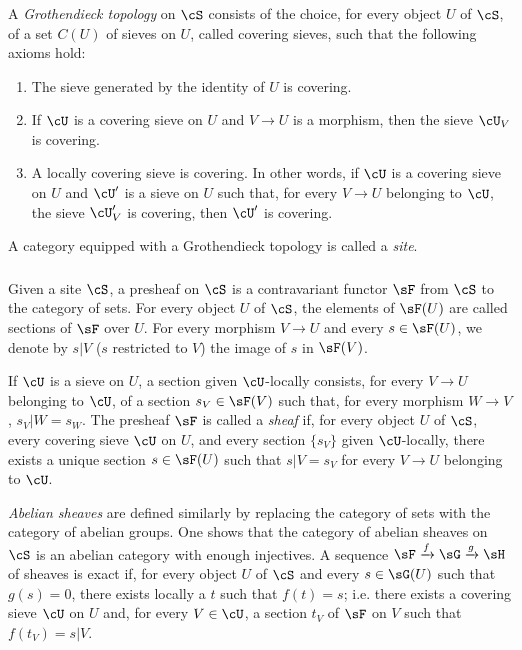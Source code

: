 \documentclass[oneside]{book}
\begin{document}
\subsubsection{}\label{I:1-6-2}

A \emph{Grothendieck topology} on $\cS$ consists of the choice, for every
object $U$ of $\cS$, of a set $C(U)$ of sieves on $U$, called
covering sieves, such that the following axioms hold:
\begin{enumerate}[\indent a)]
  \item The sieve generated by the identity of $U$ is covering.
  \item If $\cU$ is a covering sieve on $U$ and $V\to U$ is a
    morphism, then the sieve $\cU_V$ is covering.
  \item A locally covering sieve is covering. In other words, if $\cU$
    is a covering sieve on $U$ and $\cU'$ is a sieve on $U$ such that,
    for every $V\to U$ belonging to $\cU$, the sieve $\cU_V'$ is
    covering, then $\cU'$ is covering.
\end{enumerate}

A category equipped with a Grothendieck topology is called a \emph{site}.

\subsubsection{}\label{I:1-6-3}

Given a site $\cS$, a presheaf on $\cS$ is a contravariant functor
$\sF$ from $\cS$ to the category of sets. For every object $U$ of
$\cS$, the elements of $\sF(U)$ are called sections of $\sF$ over
$U$. For every morphism $V\to U$ and every $s\in\sF(U)$, we denote by
$s|V$ ($s$ restricted to $V$) the image of $s$ in $\sF(V)$.

If $\cU$ is a sieve on $U$, a section given $\cU$-locally consists,
for every $V\to U$ belonging to $\cU$, of a section
$s_V\in\sF(V)$ such that, for every morphism $W\to V$,
$s_V|W=s_W$. The presheaf $\sF$ is called a \emph{sheaf} if, for every
object $U$ of $\cS$, every covering sieve $\cU$ on $U$, and every
section $\{s_V\}$ given $\cU$-locally, there exists a unique section
$s\in\sF(U)$ such that $s|V=s_V$ for every $V\to U$ belonging to
$\cU$.

\emph{Abelian sheaves} are defined similarly by replacing the category of
sets with the category of abelian groups. One shows that the category of
abelian sheaves on $\cS$ is an abelian category with enough injectives. A
sequence $\sF\xrightarrow f\sG\xrightarrow g\sH$ of sheaves is exact if,
for every object $U$ of $\cS$ and every $s\in\sG(U)$ such that
$g(s)=0$, there exists locally a $t$ such that $f(t)=s$; i.e. there
exists a covering sieve $\cU$ on $U$ and, for every $V\in\cU$, a
section $t_V$ of $\sF$ on $V$ such that $f(t_V)=s|V$.
\end{document}
